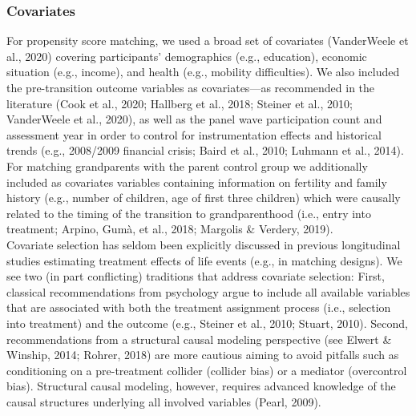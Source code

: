 \documentclass[
  english,
  man, noextraspace]{apa7}
\begin{document}
\hypertarget{covariates}{%
\subsubsection{Covariates}\label{covariates}}

For propensity score matching, we used a broad set of covariates (VanderWeele et al., 2020) covering participants' demographics (e.g., education), economic situation (e.g., income), and health (e.g., mobility difficulties). We also included the pre-transition outcome variables as covariates---as recommended in the literature (Cook et al., 2020; Hallberg et al., 2018; Steiner et al., 2010; VanderWeele et al., 2020), as well as the panel wave participation count and assessment year in order to control for instrumentation effects and historical trends (e.g., 2008/2009 financial crisis; Baird et al., 2010; Luhmann et al., 2014). For matching grandparents with the parent control group we additionally included as covariates variables containing information on fertility and family history (e.g., number of children, age of first three children) which were causally related to the timing of the transition to grandparenthood (i.e., entry into treatment; Arpino, Gumà, et al., 2018; Margolis \& Verdery, 2019).\\
Covariate selection has seldom been explicitly discussed in previous longitudinal studies estimating treatment effects of life events (e.g., in matching designs). We see two (in part conflicting) traditions that address covariate selection: First, classical recommendations from psychology argue to include all available variables that are associated with both the treatment assignment process (i.e., selection into treatment) and the outcome (e.g., Steiner et al., 2010; Stuart, 2010). Second, recommendations from a structural causal modeling perspective (see Elwert \& Winship, 2014; Rohrer, 2018) are more cautious aiming to avoid pitfalls such as conditioning on a pre-treatment collider (collider bias) or a mediator (overcontrol bias). Structural causal modeling, however, requires advanced knowledge of the causal structures underlying all involved variables (Pearl, 2009).\\
\end{document}
